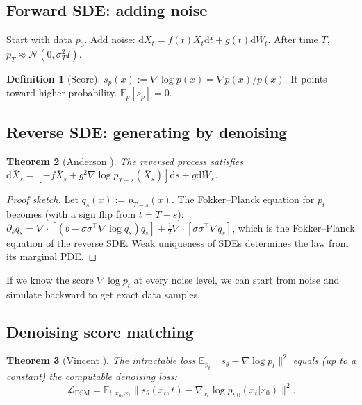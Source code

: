 \documentclass[11pt,letterpaper]{article}
\theoremstyle{plain}
\newtheorem{theorem}{Theorem}[section]
\theoremstyle{definition}
\newtheorem{definition}[theorem]{Definition}
\theoremstyle{remark}
\newcommand{\E}{\mathbb{E}}
\newcommand{\dd}{\mathrm{d}}
\newcommand{\calN}{\mathcal{N}}
\newcommand{\grad}{\nabla}
\newcommand{\divg}{\nabla\cdot}
\newcommand{\norm}[1]{\lVert #1\rVert}
\begin{document}
\begin{advancedmath}
\subsection{Forward SDE: adding noise}

Start with data $p_0$. Add noise:
$\dd X_t=f(t)X_t\dd t+g(t)\dd W_t$. After time $T$,
$p_T\approx\calN(0,\sigma_T^2I)$.

\begin{definition}[Score]
$s_p(x):=\grad\log p(x)=\grad p(x)/p(x)$. It points toward higher
probability. $\E_p[s_p]=0$.
\end{definition}

\subsection{Reverse SDE: generating by denoising}

\begin{theorem}[Anderson \citep{anderson1982reverse}]
The reversed process satisfies
$\dd\bar X_s=[-f\bar X_s+g^2\grad\log p_{T-s}(\bar X_s)]\dd s+g\dd\bar W_s$.
\end{theorem}

\begin{proof}[Proof sketch]
Let $q_s(x):=p_{T-s}(x)$. The Fokker--Planck equation for $p_t$
becomes (with a sign flip from $t=T-s$):
$\partial_s q_s=\divg[(b-\sigma\sigma^\top\grad\log q_s)q_s]
+\tfrac12\divg[\sigma\sigma^\top\grad q_s]$,
which is the Fokker--Planck equation of the reverse SDE.
Weak uniqueness of SDEs determines the law from its marginal PDE.
\end{proof}

If we know the score $\grad\log p_t$ at every noise level, we can
start from noise and simulate backward to get exact data samples.

\subsection{Denoising score matching}

\begin{theorem}[Vincent \citep{vincent2011connection}]\label{thm:dsm}
The intractable loss $\E_{p_t}\norm{s_\theta-\grad\log p_t}^2$ equals
(up to a constant) the computable denoising loss:
\begin{equation}
  \mathcal{L}_{\mathrm{DSM}}
  =\E_{t,x_0,x_t}\norm{s_\theta(x_t,t)-\grad_{x_t}\log p_{t|0}(x_t|x_0)}^2.
  \label{eq:dsm}
\end{equation}
\end{theorem}


\end{advancedmath}
\end{document}

